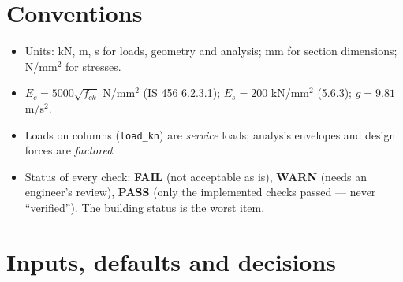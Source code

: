 \documentclass[10pt,a4paper]{article}
\newcommand{\code}[1]{\texttt{\small #1}}
\newcommand{\fck}{f_{ck}}
\begin{document}
\section{Conventions}
\begin{itemize}
\item Units: kN, m, s for loads, geometry and analysis; mm for section dimensions; N/mm$^2$ for stresses.
\item $E_c = 5000\sqrt{\fck}$ N/mm$^2$ (IS 456 6.2.3.1); $E_s = 200$ kN/mm$^2$ (5.6.3); $g = 9.81$ m/s$^2$.
\item Loads on columns (\code{load\_kn}) are \emph{service} loads; analysis envelopes and design forces are
\emph{factored}.
\item Status of every check: \textbf{FAIL} (not acceptable as is), \textbf{WARN} (needs an engineer's review),
\textbf{PASS} (only the implemented checks passed --- never ``verified''). The building status is the worst item.
\end{itemize}

\section{Inputs, defaults and decisions}
\end{document}
